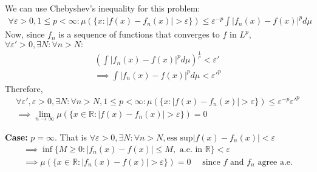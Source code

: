 \documentclass{article}
\newcommand{\R}{\mathbb{R}}
\begin{document}
We can use Chebyshev's inequality for this problem:
\begin{gather*}
    \forall \varepsilon>0, 1 \leq p <\infty:
    \mu(\{x: |f(x) - f_n(x)| > \varepsilon\}) \leq \varepsilon^{-p}\int |f_n(x) - f(x)|^p d\mu
\end{gather*}
Now, since $f_n$ is a sequence of functions that converges to $f$ in $L^p$, $\forall \varepsilon'>0, \exists N:\forall n > N:$
\begin{gather*}
    \left(\int |f_n(x) - f(x)|^p d\mu \right)^{\frac{1}{p}} < \varepsilon'\\
    \implies \int |f_n(x) - f(x)|^p d\mu < \varepsilon'^{p}
\end{gather*}
Therefore,
\begin{gather*}
    \forall \varepsilon',\varepsilon>0, \exists N: \forall n> N,  1 \leq p <\infty:
    \mu(\{x: |f(x) - f_n(x)| > \varepsilon\}) \leq \varepsilon^{-p}\varepsilon'^{p}\\
    \implies \lim_{n \rightarrow \infty} \mu(\{x \in \R: |f(x) - f_n(x)| > \varepsilon\}) = 0
\end{gather*}

\textbf{Case: } $p = \infty$. That is $\forall \varepsilon>0, \exists N: \forall n>N, \text{ess sup} |f(x) - f_n(x)| < \varepsilon$
\begin{gather*}
    \implies \inf \{M \geq 0: |f_n(x) - f(x)| \leq M, \text{ a.e. in } \R\} < \varepsilon\\ 
    \implies \mu(\{x\in \R: |f_n(x) - f(x)| > \varepsilon\}) = 0 \quad \text{ since } f \text{ and } f_n \text{ agree a.e.}
\end{gather*}
\end{document}
